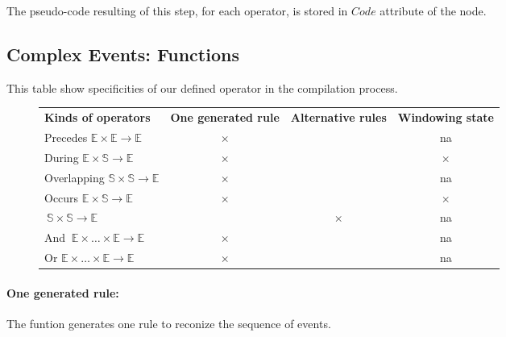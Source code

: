 The pseudo-code resulting of this step, for each operator, is stored in $Code$ attribute of the node.
\subsection{Complex Events: Functions}
This table show specificities of our defined operator in the compilation process.
\begin{figure}[h]
  \begin{tabular}{|l|c|c||c|} 
    \cline{1-4}
    \textbf{Kinds of operators}&\textbf{One generated rule} & \textbf{Alternative rules} & \textbf{Windowing state}\\
    \cline{1-4}
    Precedes \quad\quad\quad\quad$\mathds{E}\times\mathds{E}\rightarrow \mathds{E}$ & $\times$ &  & na\\
    \cline{1-4}
    During \quad\quad\quad\quad\quad$\mathds{E}\times\mathds{S}\rightarrow \mathds{E}$& $\times$ &  & $\times$ \\
    \cline{1-4} 
    Overlapping \quad\quad\quad$\mathds{S}\times\mathds{S}\rightarrow \mathds{E}$ & $\times$ &  & na\\
    \cline{1-4}
    Occurs \quad\quad\quad\quad\quad $\mathds{E}\times\mathds{S}\rightarrow \mathds{E}$& $\times$ &  & $\times$ \\
    \cline{2-4}
    \quad\quad\quad\quad\quad\quad\quad\quad$\ \mathds{S}\times\mathds{S}\rightarrow \mathds{E}$&  & $\times$ & na \\
    \cline{1-4}  
    And \quad\quad\quad $\ \mathds{E}\times\dots\times\mathds{E}\rightarrow \mathds{E}$& $\times$ & & na\\   
    \cline{1-4}
    Or \quad\quad\quad\quad$ \mathds{E}\times\dots\times\mathds{E}\rightarrow \mathds{E}$& $\times$  &  & na\\  
    \cline{1-4}
  \end{tabular}
  \caption{}
  \label{}
\end{figure}
\paragraph{One generated rule:} The funtion generates one rule to reconize the sequence of events.
